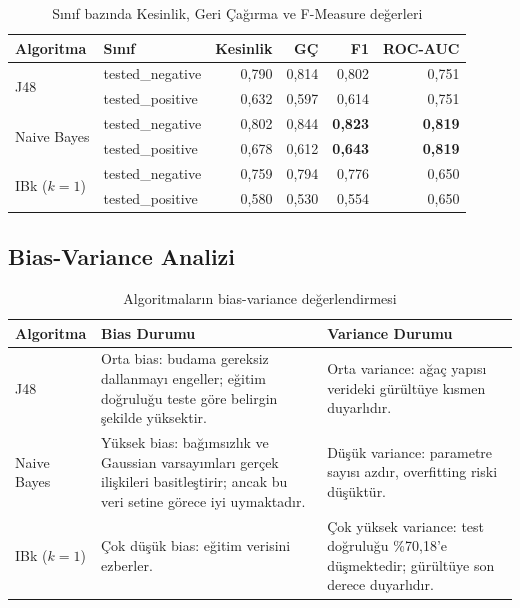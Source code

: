\documentclass[12pt,a4paper]{article}
\begin{document}
\begin{table}[H]
\centering
\caption{Sınıf bazında Kesinlik, Geri Çağırma ve F-Measure değerleri}
\label{tab:classperf}
\begin{tabular}{@{}llrrrr@{}}
\toprule
\textbf{Algoritma} & \textbf{Sınıf} &
\textbf{Kesinlik} & \textbf{GÇ} & \textbf{F1} & \textbf{ROC-AUC} \\
\midrule
\multirow{2}{*}{J48}
  & tested\_negative & 0{,}790 & 0{,}814 & 0{,}802 & 0{,}751 \\
  & tested\_positive & 0{,}632 & 0{,}597 & 0{,}614 & 0{,}751 \\
\midrule
\multirow{2}{*}{Naive Bayes}
  & tested\_negative & 0{,}802 & 0{,}844 & \textbf{0{,}823} & \textbf{0{,}819} \\
  & tested\_positive & 0{,}678 & 0{,}612 & \textbf{0{,}643} & \textbf{0{,}819} \\
\midrule
\multirow{2}{*}{IBk ($k{=}1$)}
  & tested\_negative & 0{,}759 & 0{,}794 & 0{,}776 & 0{,}650 \\
  & tested\_positive & 0{,}580 & 0{,}530 & 0{,}554 & 0{,}650 \\
\bottomrule
\end{tabular}
\end{table}

\subsection{Bias-Variance Analizi}

\begin{table}[H]
\centering
\caption{Algoritmaların bias-variance değerlendirmesi}
\label{tab:biasvar}
\begin{tabular}{@{}lp{5.2cm}p{5.2cm}@{}}
\toprule
\textbf{Algoritma} & \textbf{Bias Durumu} & \textbf{Variance Durumu} \\
\midrule
J48 &
  Orta bias: budama gereksiz dallanmayı engeller; eğitim doğruluğu teste göre
  belirgin şekilde yüksektir. &
  Orta variance: ağaç yapısı verideki gürültüye kısmen duyarlıdır. \\
\midrule
Naive Bayes &
  Yüksek bias: bağımsızlık ve Gaussian varsayımları gerçek ilişkileri
  basitleştirir; ancak bu veri setine görece iyi uymaktadır. &
  Düşük variance: parametre sayısı azdır, overfitting riski düşüktür. \\
\midrule
IBk ($k{=}1$) &
  Çok düşük bias: eğitim verisini ezberler. &
  Çok yüksek variance: test doğruluğu \%70{,}18'e düşmektedir;
  gürültüye son derece duyarlıdır. \\
\bottomrule
\end{tabular}
\end{table}
\end{document}
